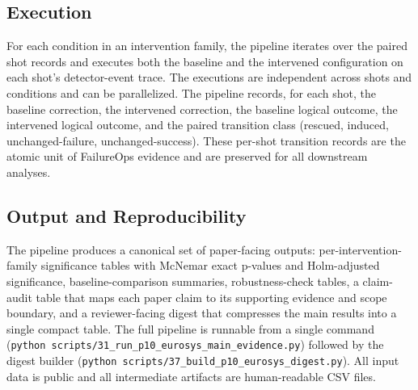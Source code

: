 \subsection{Execution}

For each condition in an intervention family, the pipeline iterates over the paired shot records and executes both the baseline and the intervened configuration on each shot's detector-event trace. The executions are independent across shots and conditions and can be parallelized. The pipeline records, for each shot, the baseline correction, the intervened correction, the baseline logical outcome, the intervened logical outcome, and the paired transition class (rescued, induced, unchanged-failure, unchanged-success). These per-shot transition records are the atomic unit of FailureOps evidence and are preserved for all downstream analyses.

\subsection{Output and Reproducibility}

The pipeline produces a canonical set of paper-facing outputs: per-intervention-family significance tables with McNemar exact p-values and Holm-adjusted significance, baseline-comparison summaries, robustness-check tables, a claim-audit table that maps each paper claim to its supporting evidence and scope boundary, and a reviewer-facing digest that compresses the main results into a single compact table. The full pipeline is runnable from a single command (\texttt{python scripts/31\_run\_p10\_eurosys\_main\_evidence.py}) followed by the digest builder (\texttt{python scripts/37\_build\_p10\_eurosys\_digest.py}). All input data is public and all intermediate artifacts are human-readable CSV files.
